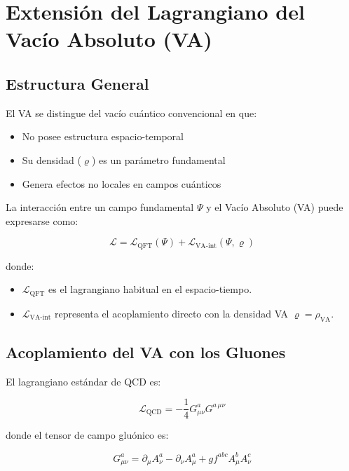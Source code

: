 \documentclass[twoside]{article}
\theoremstyle{definition}
\theoremstyle{remark}
\numberwithin{equation}{section}
\theoremstyle{definition}
\theoremstyle{example}
\theoremstyle{remark}
\numberwithin{equation}{section}%
\begin{document}
		
		\section{Extensión del Lagrangiano del Vacío Absoluto (VA)}
		
		\subsection{Estructura General}
		
		El VA se distingue del vacío cuántico convencional en que:
		\begin{itemize}
			\item No posee estructura espacio-temporal \cite{Rovelli2018}
			\item Su densidad (\(\varrho\)) es un parámetro fundamental
			\item Genera efectos no locales en campos cuánticos
		\end{itemize}       
		
		
		La interacción entre un campo fundamental \( \Psi \) y el Vacío Absoluto (VA) puede expresarse como:
		
		\begin{equation}
			\mathcal{L} = \mathcal{L}_{\text{QFT}}(\Psi) + \mathcal{L}_{\text{VA-int}}(\Psi, \varrho)
		\end{equation}
		
		donde:
		\begin{itemize}
			\item \( \mathcal{L}_{\text{QFT}} \) es el lagrangiano habitual en el espacio-tiempo.
			\item \( \mathcal{L}_{\text{VA-int}} \) representa el acoplamiento directo con la densidad VA \( \varrho = \rho_{\text{VA}} \).
		\end{itemize}
		
		\subsection{Acoplamiento del VA con los Gluones}
		El lagrangiano estándar de QCD es:
		
		\begin{equation}
			\mathcal{L}_{\text{QCD}} = -\frac{1}{4} G^a_{\mu\nu} G^{a\,\mu\nu}
		\end{equation}
		
		donde el tensor de campo gluónico es:
		
		\begin{equation}
			G^a_{\mu\nu} = \partial_\mu A^a_\nu - \partial_\nu A^a_\mu + g f^{abc} A^b_\mu A^c_\nu
		\end{equation}
		
\end{document}
